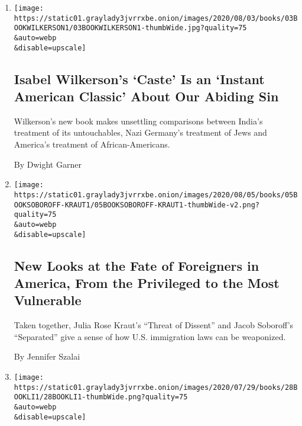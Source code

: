 \begin{enumerate}
\def\labelenumi{\arabic{enumi}.}
\item
  \href{/2020/07/31/books/review-caste-isabel-wilkerson-origins-of-our-discontents.html}{}

  \texttt{[image: https://static01.graylady3jvrrxbe.onion/images/2020/08/03/books/03BOOKWILKERSON1/03BOOKWILKERSON1-thumbWide.jpg?quality=75\\\&auto=webp\\\&disable=upscale]}

  \hypertarget{isabel-wilkersons-caste-is-an-instant-american-classic-about-our-abiding-sin}{%
  \subsection{Isabel Wilkerson's `Caste' Is an `Instant American
  Classic' About Our Abiding
  Sin}\label{isabel-wilkersons-caste-is-an-instant-american-classic-about-our-abiding-sin}}

  Wilkerson's new book makes unsettling comparisons between India's
  treatment of its untouchables, Nazi Germany's treatment of Jews and
  America's treatment of African-Americans.

  By Dwight Garner
\item
  \href{/2020/07/30/books/review-threat-dissent-julia-rose-kraut-separated-jacob-soboroff.html}{}

  \texttt{[image: https://static01.graylady3jvrrxbe.onion/images/2020/08/05/books/05BOOKSOBOROFF-KRAUT1/05BOOKSOBOROFF-KRAUT1-thumbWide-v2.png?quality=75\\\&auto=webp\\\&disable=upscale]}

  \hypertarget{new-looks-at-the-fate-of-foreigners-in-america-from-the-privileged-to-the-most-vulnerable}{%
  \subsection{New Looks at the Fate of Foreigners in America, From the
  Privileged to the Most
  Vulnerable}\label{new-looks-at-the-fate-of-foreigners-in-america-from-the-privileged-to-the-most-vulnerable}}

  Taken together, Julia Rose Kraut's ``Threat of Dissent'' and Jacob
  Soboroff's ``Separated'' give a sense of how U.S. immigration laws can
  be weaponized.

  By Jennifer Szalai
\item
  \href{/2020/07/28/books/review-must-i-go-yiyun-li.html}{}

  \texttt{[image: https://static01.graylady3jvrrxbe.onion/images/2020/07/29/books/28BOOKLI1/28BOOKLI1-thumbWide.png?quality=75\\\&auto=webp\\\&disable=upscale]}


\end{enumerate}
